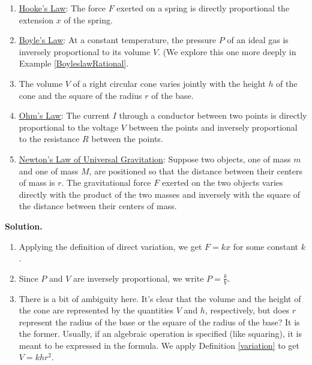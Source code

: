 \documentclass{ximera}
\begin{document}
{\begin{example}
\begin{enumerate}
\item  \href{http://en.wikipedia.org/wiki/Hooke's_law}{\underline{Hooke's Law}}:   The force $F$ exerted on a spring is directly proportional the extension $x$ of the spring.

\item  \href{http://en.wikipedia.org/wiki/Boyle's_law}{\underline{Boyle's Law}}:   At a constant temperature, the pressure $P$ of an ideal gas is inversely proportional to its volume $V$.  (We explore this one more deeply in Example \ref{BoyleslawRational}.

\item  The volume $V$ of a right circular cone varies jointly with the height $h$ of the cone and the square of the radius $r$ of the base.

\item  \href{http://en.wikipedia.org/wiki/Ohm's_law}{\underline{Ohm's Law}}:   The current $I$ through a conductor between two points is directly proportional to the voltage $V$ between the points and inversely proportional to the resistance $R$ between the points.

\item \label{gravitylaw} \href{http://en.wikipedia.org/wiki/Law_of_universal_gravitation}{\underline{Newton's Law of Universal Gravitation}}:   Suppose two objects, one of mass $m$ and one of mass $M$, are positioned so that the distance between their centers of mass is $r$.  The gravitational force $F$ exerted on the two objects varies directly with the product of the two masses and inversely with the square of the distance between their centers of mass.

\end{enumerate}

{\bf Solution.}  

\begin{enumerate}

\item Applying the definition of direct variation, we get  $F = k x$ for some constant $k$.

\item Since $P$ and $V$ are inversely proportional, we write $P = \frac{k}{V}$.

\item  There is a bit of ambiguity here.  It's clear that the volume and the height of the cone are represented by the quantities $V$ and $h$, respectively, but does $r$ represent the radius of the base or the square of the radius of the base?  It is the former.  Usually, if an algebraic operation is specified (like squaring), it is meant to be expressed in the formula.  We apply Definition \ref{variation} to get $V = k h r^{2}$.  


\end{enumerate}
\end{example}}
\end{document}
